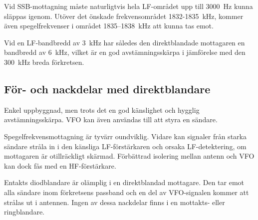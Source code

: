 Vid SSB-mottagning måste naturligtvis hela LF-området upp till 3000~Hz
kunna släppas igenom.
Utöver det önskade frekvensområdet 1832-1835~kHz, kommer även spegelfrekvenser
i området 1835--1838~kHz att kunna tas emot.

Vid en LF-bandbredd av 3~kHz har således den direktblandade mottagaren
en bandbredd av 6~kHz, vilket är en god avstämningsskärpa i jämförelse
med den 300~kHz breda förkretsen.

\subsection{För- och nackdelar med direktblandare}

Enkel uppbyggnad, men trots det en god känslighet och hygglig avstämningsskärpa.
VFO kan även användas till att styra en sändare.

Spegelfrekvensmottagning är tyvärr oundviklig.
Vidare kan signaler från starka sändare stråla in i den känsliga
LF-förstärkaren och orsaka LF-detektering, om mottagaren är otillräckligt
skärmad.
Förbättrad isolering mellan antenn och VFO kan dock fås med en HF-förstärkare.

Entakts diodblandare är olämplig i en direktblandad mottagare.
Den tar emot alla sändare inom förkretsens passband och en del av VFO-signalen
kommer att strålas ut i antennen.
Ingen av dessa nackdelar finns i en mottakts- eller ringblandare.
